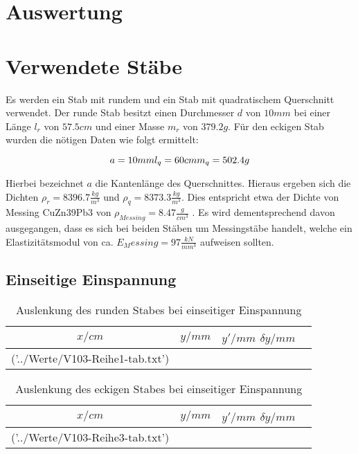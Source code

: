 \section{Auswertung}
\label{sec:Auswertung}

\section{Verwendete Stäbe}
\label{sec:Stäbe}

Es werden ein Stab mit rundem und ein Stab mit quadratischem Querschnitt verwendet. Der runde Stab besitzt einen Durchmesser $d$ von $10mm$ bei einer Länge $l_{r}$ von $57.5cm$ und einer Masse $m_{r}$ von $379.2g$.
Für den eckigen Stab wurden die nötigen Daten wie folgt ermittelt:

\begin{equation*}
  a = 10mm \\
  l_{q} = 60cm \\
  m_{q} = 502.4g \\
\end{equation*}

Hierbei bezeichnet $a$ die Kantenlänge des Querschnittes. Hieraus ergeben sich die Dichten $\rho_{r} = 8396.7\frac{kg}{m^3}$ und $\rho_{q} = 8373.3\frac{kg}{m^3}$. Dies entspricht etwa der Dichte von  Messing CuZn39Pb3 von $\rho_{Messing} = 8.47\frac{g}{cm^3}$ \cite{DKI}. Es wird dementsprechend davon ausgegangen, dass es sich bei beiden Stäben um Messingstäbe handelt, welche ein Elastizitätsmodul von ca. $E_Messing = 97 \frac{kN}{mm^3}$ \cite{DKI} aufweisen sollten.

\subsection{Einseitige Einspannung}
\label{sec:Einseitig}

\begin{table}
  \centering
\caption{Auslenkung des runden Stabes bei einseitiger Einspannung}
\label{tab:rund}
\begin{tabular}{S S S S}
  \toprule
  {$x/cm$} & {$y/mm$} & {$y'/mm$} {$\delta y/mm$}\\
  \midrule
  ('../Werte/V103-Reihe1-tab.txt')
\bottomrule
\end{tabular}
\end{table}
\FloatBarrier

\begin{table}
  \centering
\caption{Auslenkung des eckigen Stabes bei einseitiger Einspannung}
\label{tab:eckig}
\begin{tabular}{S S S S}
  \toprule
  {$x/cm$} & {$y/mm$} & {$y'/mm$} {$\delta y/mm$}\\
  \midrule
  ('../Werte/V103-Reihe3-tab.txt')
\bottomrule
\end{tabular}
\end{table}
\FloatBarrier

